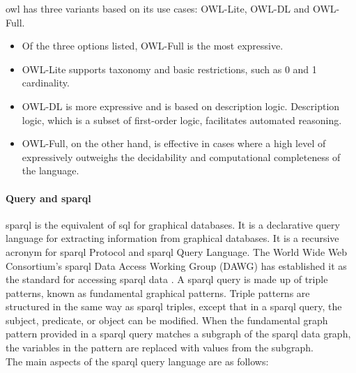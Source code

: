             \acrshort{owl} has three variants based on its use cases: OWL-Lite, OWL-DL and OWL-Full. 
        
            \begin{itemize}
                \item Of the three options listed, OWL-Full is the most expressive. 
                \item OWL-Lite supports taxonomy and basic restrictions, such as 0 and 1 cardinality. 
                \item OWL-DL is more expressive and is based on description logic. Description logic, which is a subset of first-order logic, facilitates automated reasoning. 
                \item OWL-Full, on the other hand, is effective in cases where a high level of expressively outweighs the decidability and computational completeness of the language.
            \end{itemize}

            \paragraph{Query and \acrshort{sparql}\label{para:sparql}}
            \acrfull{sparql} is the equivalent of \acrfull{sql} for graphical databases. It is a declarative query language for extracting information from graphical databases. It is a recursive acronym for \acrshort{sparql} Protocol and \acrshort{sparql} Query Language. The World Wide Web Consortium's \acrshort{sparql} Data Access Working Group (DAWG) has established it as the standard for accessing \acrshort{sparql} data \cite{abad2021semankey}. A \acrshort{sparql} query is made up of triple patterns, known as fundamental graphical patterns. Triple patterns are structured in the same way as \acrshort{sparql} triples, except that in a \acrshort{sparql} query, the subject, predicate, or object can be modified. When the fundamental graph pattern provided in a \acrshort{sparql} query matches a subgraph of the \acrshort{sparql} data graph, the variables in the pattern are replaced with values from the subgraph.\\
        
            The main aspects of the \acrshort{sparql} query language are as follows: 
        
